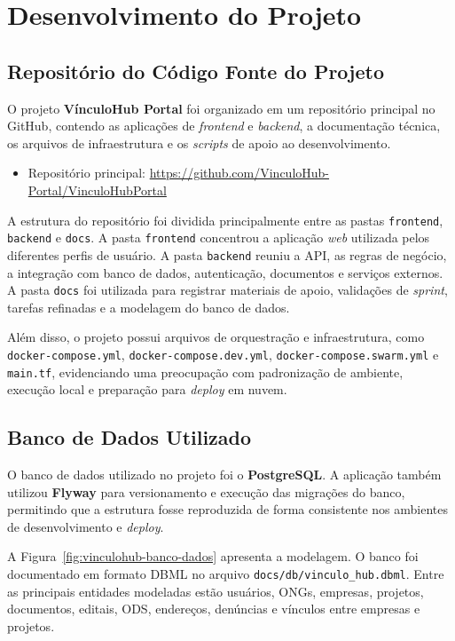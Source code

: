 \section{Desenvolvimento do Projeto}

\subsection{Repositório do Código Fonte do Projeto}

O projeto \textbf{VínculoHub Portal} foi organizado em um repositório principal no GitHub, contendo as aplicações de \textit{frontend} e \textit{backend}, a documentação técnica, os arquivos de infraestrutura e os \textit{scripts} de apoio ao desenvolvimento.

\begin{itemize}
\item Repositório principal: \url{https://github.com/VinculoHub-Portal/VinculoHubPortal}
\end{itemize}

A estrutura do repositório foi dividida principalmente entre as pastas \texttt{frontend}, \texttt{backend} e \texttt{docs}. A pasta \texttt{frontend} concentrou a aplicação \textit{web} utilizada pelos diferentes perfis de usuário. A pasta \texttt{backend} reuniu a \ac{API}, as regras de negócio, a integração com banco de dados, autenticação, documentos e serviços externos. A pasta \texttt{docs} foi utilizada para registrar materiais de apoio, validações de \textit{sprint}, tarefas refinadas e a modelagem do banco de dados.

Além disso, o projeto possui arquivos de orquestração e infraestrutura, como \texttt{docker-compose.yml}, \texttt{docker-compose.dev.yml}, \texttt{docker-compose.swarm.yml} e \texttt{main.tf}, evidenciando uma preocupação com padronização de ambiente, execução local e preparação para \textit{deploy} em nuvem.

\subsection{Banco de Dados Utilizado}

O banco de dados utilizado no projeto foi o \textbf{PostgreSQL}. A aplicação também utilizou \textbf{Flyway} para versionamento e execução das migrações do banco, permitindo que a estrutura fosse reproduzida de forma consistente nos ambientes de desenvolvimento e \textit{deploy}.

A Figura~\ref{fig:vinculohub-banco-dados} apresenta a modelagem. O banco foi documentado em formato \ac{DBML} no arquivo \texttt{docs/db/vinculo\_hub.dbml}. Entre as principais entidades modeladas estão usuários, \ac{ONGs}, empresas, projetos, documentos, editais, \ac{ODS}, endereços, denúncias e vínculos entre empresas e projetos.

